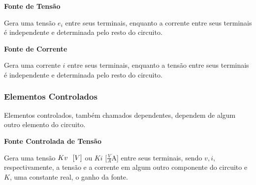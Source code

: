 \documentclass{article}
\numberwithin{equation}{section}
\newlength\Colsep
\begin{document}
\begin{minipage}[c][5cm]{\dimexpr0.45\textwidth-0.5\Colsep\relax}
    \begin{center}{\textbf{Fonte de Tensão}}\end{center}

    Gera uma tensão $e_i$ entre seus terminais, enquanto a corrente entre seus terminais é independente e determinada pelo resto do circuito.
\end{minipage} \hfill
\begin{minipage}[c][2cm][c]{\dimexpr0.05\textwidth-0.5\Colsep\relax}

\end{minipage} \hfill
\begin{minipage}[c][5cm]{\dimexpr0.45\textwidth-0.5\Colsep\relax}
    \begin{center}{\textbf{Fonte de Corrente}}\end{center}

    Gera uma corrente $i$ entre seus terminais, enquanto a tensão entre seus terminais é independente e determinada pelo resto do circuito.
\end{minipage} \hfill
\justifying
\subsubsection{Elementos Controlados}
\label{subsubsec:controlados}
Elementos controlados, também chamados dependentes, dependem de algum outro elemento do circuito.

\begin{center}{\textbf{Fonte Controlada de Tensão}}\end{center}
Gera uma tensão $Kv \hspace{0.25cm}[V]$ ou $Ki$ [$\frac{V}{A}$A] entre seus terminais, sendo $v,i$, respectivamente, a tensão e a corrente em algum outro componente do circuito e $K$, uma constante real, o ganho da fonte.\\
\begin{minipage}[c][4cm]{\dimexpr\textwidth-0.5\Colsep\relax}
\end{minipage}
\end{document}
